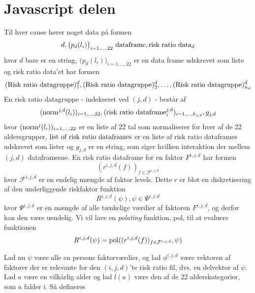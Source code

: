 \documentclass[a4paper, 12pt]{memoir}
\begin{document}
\section{Javascript delen}
Til hver cause hører noget data på formen
\begin{align*}
d, \bigl(p_d(l_i)\bigr)_{i=1, \dots, 22} \textup{ dataframe}, \textup{risk ratio data}_d
\end{align*}
hvor $d$ bare er en string, $\bigl(p_d(l_i)\bigr)_{i=1, \dots, 22}$ er en data frame udskrevet som liste og risk ratio data'et har formen
\begin{equation*}
(\textup{Risk ratio datagruppe})^d_1,(\textup{Risk ratio datagruppe})^d_2,\dots,  (\textup{Risk ratio datagruppe})^d_{n_d}
\end{equation*}
En risk ratio datagruppe - indekseret ved $(j,d)$ - består af
\begin{equation*}
(\textup{norm}^{j,d}(l_i))_{i=1, \dots, 22}, (\textup{risk ratio dataframe}_i^{j,d})_{i=1, \dots, k_{j,d}}, g_{j,d}
\end{equation*}
hvor $(\textup{norm}^j(l_i))_{i=1, \dots, 22}$ er en liste af 22 tal som normaliserer for hver af de 22 aldersgrupper, $\textup{list of risk ratio dataframes}$ er en liste af risk ratio dataframes udskrevet som lister og $g_{j,d}$ er en string, som siger hvilken interaktion der mellem $(j,d)$ dataframesne. En risk ratio dataframe for en faktor $F^{i,j,d}$ har formen
\begin{equation*}
(r^{i,j,d}(f))_{f\in \mathcal F^{i,j,d}}
\end{equation*}
hvor $\mathcal F^{i,j,d}$ er en endelig mængde af faktor levels. Dette $r$ er blot en diskretisering af den underliggende riskfaktor funktion
\begin{equation*}
R^{i,j,d}(\psi), \psi \in  \Psi^{i,j,d}
\end{equation*}
hvor $\Psi^{i,j,d}$ er en mængde af alle tænkelige værdier af faktoren $F^{i,j,d}$, og derfor kan den være uendelig. Vi vil lave en \emph{polating} funktion, pol, til at evaluere funktionen
\begin{equation}
R^{i,j,d}(\psi)=\textup{pol}((r^{i,j,d}(f))_{f\in \mathcal F^{i,j,d}}, \psi) \label{polating}
\end{equation}

Lad nu $\psi$ være alle en persons faktorværdier, og lad $\phi^{i,j,d}$ være vektoren af faktorer der er relevante for den $(i,j,d)$'te risk ratio fil, dvs. en delvektor af $\psi$. Lad $a$ være en vilkårlig alder og lad $l(a)$ være den af de 22 alderskategorier, som $a$ falder i. Så defineres
\end{document}
